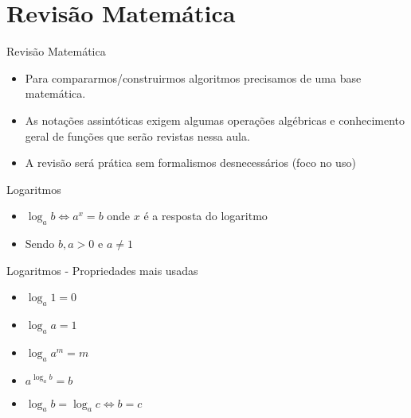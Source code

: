 \section{Revisão Matemática}

\begin{frame}
	\begin{block}{Revisão Matemática}
		\begin{itemize}
			\item Para compararmos/construirmos algoritmos precisamos de uma base matemática.
			\item As notações assintóticas exigem algumas operações algébricas e conhecimento geral de funções  que serão revistas nessa aula.
			\item A revisão será prática sem formalismos desnecessários (foco no uso)
		\end{itemize}
	\end{block}
\end{frame}

\begin{frame}
	\begin{block}{Logaritmos}
		\begin{itemize}
			\item $\log_a b \Leftrightarrow a^{x} = b $ onde $x$ é a resposta do logaritmo
			\item Sendo $b,a > 0$ e $a \neq 1$
		\end{itemize}
	\end{block}
\end{frame}

\begin{frame}
	\begin{block}{Logaritmos - Propriedades mais usadas}
		\begin{itemize}
			\item $\log_a 1 = 0$
			\item $\log_a a = 1$
			\item $ \log_a a^{m} = m $
			\item $a^{\log_a b} = b$
			\item $\log_a b = \log_a c \Leftrightarrow b = c$
		\end{itemize}
	\end{block}
\end{frame}

